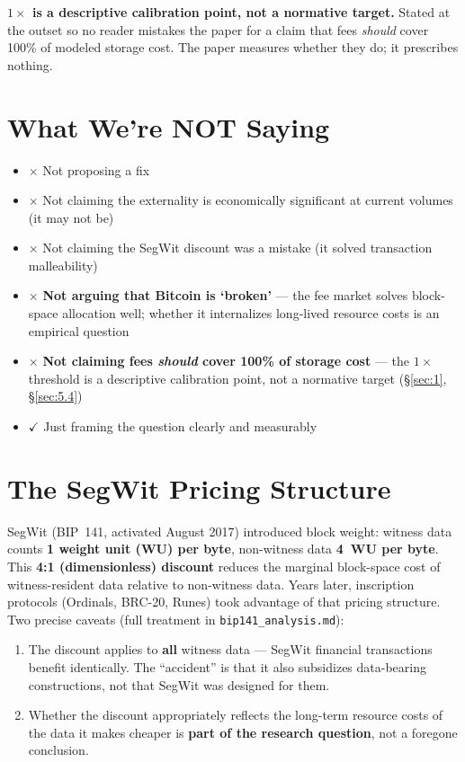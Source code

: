 \documentclass[11pt]{article}
\begin{document}
\textbf{$1\times$ is a descriptive calibration point, not a normative target.} Stated at the outset so no reader mistakes the paper for a claim that fees \emph{should} cover 100\% of modeled storage cost. The paper measures whether they do; it prescribes nothing.

\section{What We're NOT Saying}\label{sec:2}
\begin{itemize}[nosep]
  \item $\times$ Not proposing a fix
  \item $\times$ Not claiming the externality is economically significant at current volumes (it may not be)
  \item $\times$ Not claiming the SegWit discount was a mistake (it solved transaction malleability)
  \item $\times$ \textbf{Not arguing that Bitcoin is `broken'} --- the fee market solves block-space allocation well; whether it internalizes long-lived resource costs is an empirical question
  \item $\times$ \textbf{Not claiming fees \emph{should} cover 100\% of storage cost} --- the $1\times$ threshold is a descriptive calibration point, not a normative target (\S\ref{sec:1}, \S\ref{sec:5.4})
  \item $\checkmark$ Just framing the question clearly and measurably
\end{itemize}

\section{The SegWit Pricing Structure}\label{sec:3}
SegWit (BIP~141, activated August 2017) introduced block weight: witness data counts \textbf{1 weight unit (WU) per byte}, non-witness data \textbf{4~WU per byte}. This \textbf{4:1 (dimensionless) discount} reduces the marginal block-space cost of witness-resident data relative to non-witness data. Years later, inscription protocols (Ordinals, BRC-20, Runes) took advantage of that pricing structure. Two precise caveats (full treatment in \texttt{bip141\_analysis.md}):
\begin{enumerate}[nosep]
  \item The discount applies to \textbf{all} witness data --- SegWit financial transactions benefit identically. The ``accident'' is that it also subsidizes data-bearing constructions, not that SegWit was designed for them.
  \item Whether the discount appropriately reflects the long-term resource costs of the data it makes cheaper is \textbf{part of the research question}, not a foregone conclusion.
\end{enumerate}
\end{document}
